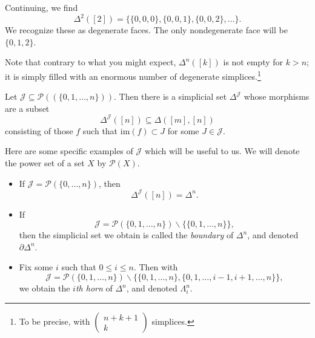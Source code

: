 \documentclass[main.tex]{subfiles}
\begin{document}
Continuing, we find
\begin{equation*}
  \Delta^{2}([2]) = \{\{0,0,0\}, \{0,0,1\}, \{0,0,2\}, \ldots\}.
\end{equation*}
We recognize these as degenerate faces. The only nondegenerate face will be $\{0,1,2\}$.

Note that contrary to what you might expect, $\Delta^{n}([k])$ is not empty for $k > n$; it is simply filled with an enormous number of degenerate simplices.\footnote{To be precise, with $\begin{pmatrix} n+k+1 \\ k \end{pmatrix}$ simplices.}

\begin{example}
  Let $\mathcal{J} \subseteq \mathcal{P}((\{0, 1, \ldots, n\}))$. Then there is a simplicial set $\Delta^{\mathcal{J}}$ whose morphisms are a subset
  \begin{equation*}
    \Delta^{\mathcal{J}}([n]) \subseteq \Delta([m], [n])
  \end{equation*}
  consisting of those $f$ such that $\mathrm{im}(f) \subset J$ for some $J \in \mathcal{J}$.

  Here are some specific examples of $\mathcal{J}$ which will be useful to us. We will denote the power set of a set $X$ by $\mathcal{P}(X)$.
  \begin{itemize}
    \item If $\mathcal{J} = \mathcal{P}(\{0, \ldots, n\})$, then
      \begin{equation*}
        \Delta^{\mathcal{J}}([n]) = \Delta^{n}.
      \end{equation*}

    \item If
      \begin{equation*}
        \mathcal{J} = \mathcal{P}(\{0, 1, \ldots, n\}) \smallsetminus \{\{0, 1, \ldots, n\}\},
      \end{equation*}
      then the simplicial set we obtain is called the \emph{boundary} of $\Delta^{n}$, and denoted $\partial \Delta^{n}$.

    \item Fix some $i$ such that $0 \leq i \leq n$. Then with
      \begin{equation*}
        \mathcal{J} = \mathcal{P}(\{0, 1, \ldots, n\}) \smallsetminus \{\{0, 1, \ldots, n\}, \{0, 1, \ldots, i - 1, i + 1, \ldots, n\}\},
      \end{equation*}
      we obtain the \emph{$i$th horn} of $\Delta^{n}$, and denoted $\Lambda^{n}_{i}$.


\end{itemize}
\end{example}
\end{document}
